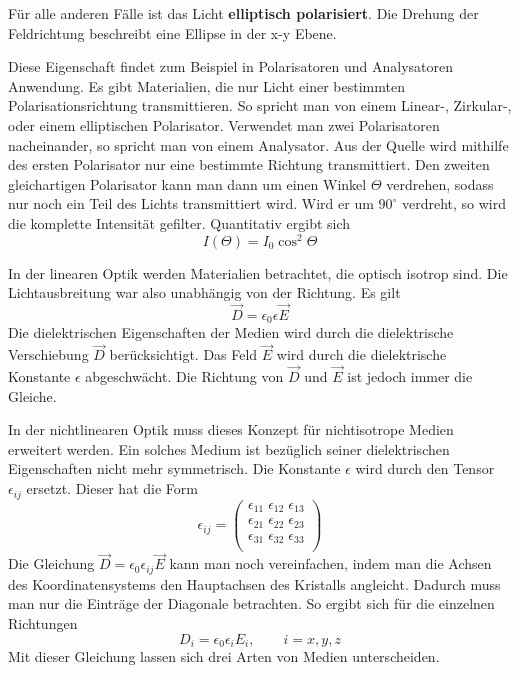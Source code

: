 Für alle anderen Fälle ist das Licht \textbf{elliptisch polarisiert}. Die 
Drehung der Feldrichtung beschreibt eine Ellipse in der x-y Ebene.

Diese Eigenschaft findet zum Beispiel in Polarisatoren und Analysatoren Anwendung.
Es gibt Materialien, die nur Licht einer bestimmten Polarisationsrichtung
transmittieren. So spricht man von einem Linear-, Zirkular-, oder einem elliptischen
Polarisator. Verwendet man zwei Polarisatoren nacheinander, so spricht man von 
einem Analysator.
Aus der Quelle wird mithilfe des ersten Polarisator nur eine bestimmte
Richtung transmittiert. Den zweiten gleichartigen Polarisator kann man 
dann um einen Winkel $\Theta$ verdrehen, sodass nur noch ein Teil des Lichts
transmittiert wird. Wird er um $90^\circ$ verdreht, so wird die komplette
Intensität gefilter. Quantitativ ergibt sich
\[
    I(\Theta) = I_0 \cos^2 \Theta
\]

In der linearen Optik werden Materialien betrachtet, die optisch isotrop sind.
Die Lichtausbreitung war also unabhängig von der Richtung. Es gilt
\[
    \vec{D} = \epsilon_0 \epsilon \vec{E}
\]
Die dielektrischen Eigenschaften der Medien wird durch die dielektrische
Verschiebung $\vec{D}$ berücksichtigt. Das Feld $\vec{E}$ wird durch
die dielektrische Konstante $\epsilon$ abgeschwächt. Die Richtung von 
$\vec{D}$ und $\vec{E}$ ist jedoch immer die Gleiche. 

In der nichtlinearen Optik muss dieses Konzept für nichtisotrope Medien erweitert
werden. Ein solches Medium ist bezüglich seiner dielektrischen Eigenschaften nicht
mehr symmetrisch. Die Konstante $\epsilon$ wird durch den Tensor $\epsilon_{ij}$ 
ersetzt. Dieser hat die Form
\[
    \epsilon_{ij} = 
        \begin{pmatrix}
            \epsilon_{11} \; \epsilon_{12} \; \epsilon_{13} \\
            \epsilon_{21} \; \epsilon_{22} \; \epsilon_{23} \\
            \epsilon_{31} \; \epsilon_{32} \; \epsilon_{33} \\
        \end{pmatrix}
\]
Die Gleichung $\vec{D} = \epsilon_0 \epsilon_{ij} \vec{E}$ kann man noch 
vereinfachen,
indem man die Achsen des Koordinatensystems den Hauptachsen des Kristalls angleicht.
Dadurch muss man nur die Einträge der Diagonale betrachten.
So ergibt sich für die einzelnen Richtungen
\[
    D_i = \epsilon_0 \epsilon_i E_i, \qquad i=x,y,z
\]
Mit dieser Gleichung lassen sich drei Arten von Medien unterscheiden.

